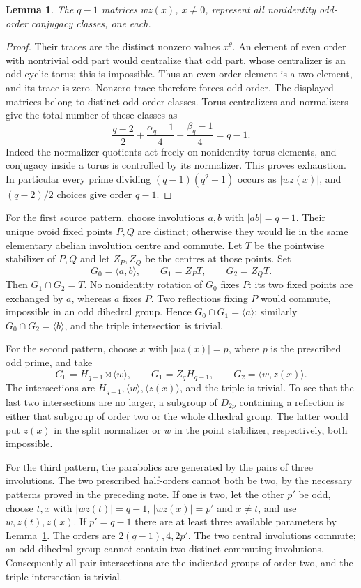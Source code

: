 \documentclass[11pt,a4paper]{article}
\newtheorem{lemma}{Lemma}\newtheorem{theorem}[lemma]{Theorem}
\newcommand{\gen}[1]{\langle#1\rangle}
\begin{document}
\begin{lemma}\label{trace}
The $q-1$ matrices $wz(x)$, $x\ne0$, represent all nonidentity
odd-order conjugacy classes, one each.
\end{lemma}
\begin{proof}
Their traces are the distinct nonzero values $x^\theta$. An element
of even order with nontrivial odd part would centralize that odd part,
whose centralizer is an odd cyclic torus; this is impossible. Thus an
even-order element is a two-element, and its trace is zero. Nonzero
trace therefore forces odd order. The displayed matrices belong to
distinct odd-order classes. Torus centralizers and normalizers
give the total number of these classes as
\[
 \frac{q-2}{2}+\frac{\alpha_q-1}{4}+\frac{\beta_q-1}{4}=q-1.
\]
Indeed the normalizer quotients act freely on nonidentity torus elements,
and conjugacy inside a torus is controlled by its normalizer. This proves
exhaustion. In particular every prime dividing $(q-1)(q^2+1)$ occurs
as $|wz(x)|$, and $(q-2)/2$ choices give order $q-1$.
\end{proof}

For the first source pattern, choose involutions $a,b$ with $|ab|=q-1$.
Their unique ovoid fixed points $P,Q$ are distinct; otherwise they would
lie in the same elementary abelian involution centre and commute.
Let $T$ be the pointwise stabilizer of $P,Q$ and let $Z_P,Z_Q$ be
the centres at those points. Set
\[
 G_0=\gen{a,b},\qquad G_1=Z_PT,\qquad G_2=Z_QT.
\]
Then $G_1\cap G_2=T$. No nonidentity rotation of $G_0$ fixes $P$:
its two fixed points are exchanged by $a$, whereas $a$ fixes $P$.
Two reflections fixing $P$ would commute, impossible in an odd dihedral
group. Hence $G_0\cap G_1=\gen a$; similarly
$G_0\cap G_2=\gen b$, and the triple intersection is trivial.

For the second pattern, choose $x$ with $|wz(x)|=p$, where $p$ is
the prescribed odd prime, and take
\[
 G_0=H_{q-1}\rtimes\gen w,\qquad G_1=Z_qH_{q-1},\qquad
 G_2=\gen{w,z(x)}.
\]
The intersections are $H_{q-1},\gen w,\gen{z(x)}$, and the triple
is trivial. To see that the last two intersections are no larger,
a subgroup of $D_{2p}$ containing a reflection is either that subgroup
of order two or the whole dihedral group. The latter would put
$z(x)$ in the split normalizer or $w$ in the point stabilizer,
respectively, both impossible.

For the third pattern, the parabolics are generated by the pairs of
three involutions. The two prescribed half-orders cannot both be two, by the necessary
patterns proved in the preceding note. If one is two, let the other
$p'$ be odd, choose $t,x$
with $|wz(t)|=q-1$, $|wz(x)|=p'$ and $x\ne t$, and use
$w,z(t),z(x)$. If $p'=q-1$ there are at least three available parameters
by Lemma~\ref{trace}. The orders are $2(q-1),4,2p'$. The two central
involutions commute; an odd dihedral group cannot contain two distinct
commuting involutions. Consequently all pair intersections are the
indicated groups of order two, and the triple intersection is trivial.
\end{document}
